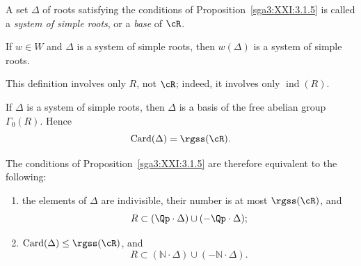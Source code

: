 \begin{definition}\label{sga3:XXI:3.1.6}
A set \(\Delta\) of roots satisfying the conditions of
Proposition~\ref{sga3:XXI:3.1.5} is called a
\emph{system of simple roots}, or a \emph{base} of \(\cR\).
\end{definition}

If \(w\in W\) and \(\Delta\) is a system of simple roots, then
\(w(\Delta)\) is a system of simple roots.

\begin{remark}\label{sga3:XXI:3.1.7}
This definition involves only \(R\), not \(\cR\); indeed, it involves
only \(\operatorname{ind}(R)\).
\end{remark}

\begin{remark}\label{sga3:XXI:3.1.8}
If \(\Delta\) is a system of simple roots, then \(\Delta\) is a basis
of the free abelian group \(\Gamma_0(R)\). Hence
\[
 \operatorname{Card}(\Delta)=\rgss(\cR).
\]
\end{remark}

\begin{remark}\label{sga3:XXI:3.1.9}
The conditions of Proposition~\ref{sga3:XXI:3.1.5} are therefore
equivalent to the following:
\begin{enumerate}
\item[(i\('\))] the elements of \(\Delta\) are indivisible, their
  number is at most \(\rgss(\cR)\), and
  \[
   R\subset(\Qp\cdot\Delta)\cup(-\Qp\cdot\Delta);
  \]
\item[(ii\('\))] \(\operatorname{Card}(\Delta)\leq\rgss(\cR)\), and
  \[
   R\subset(\mathbb N\cdot\Delta)\cup(-\mathbb N\cdot\Delta).
  \]
\end{enumerate}
\end{remark}

